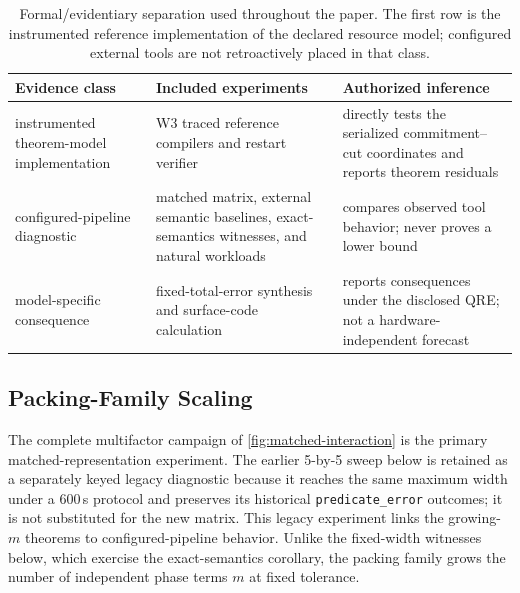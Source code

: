 \documentclass[a4paper,twocolumn,10pt,unpublished]{quantumarticle}
\begin{document}
\begin{table}[!t]
\centering
\small
\setlength{\tabcolsep}{4pt}
\begin{tabularx}{\textwidth}{@{}l X X@{}}
\toprule
Evidence class & Included experiments & Authorized inference \\
\midrule
instrumented theorem-model implementation & W3 traced reference compilers and restart verifier & directly tests the serialized commitment--cut coordinates and reports theorem residuals \\
configured-pipeline diagnostic & matched matrix, external semantic baselines, exact-semantics witnesses, and natural workloads & compares observed tool behavior; never proves a lower bound \\
model-specific consequence & fixed-total-error synthesis and surface-code calculation & reports consequences under the disclosed QRE; not a hardware-independent forecast \\
\bottomrule
\end{tabularx}
\caption{Formal/evidentiary separation used throughout the paper.  The first
row is the instrumented reference implementation of the declared resource
model; configured external tools are not retroactively placed in that class.}
\label{tab:evidence-classes}
\end{table}

\subsection{Packing-Family Scaling}
\label{sec:packing-scaling}

The complete multifactor campaign of \cref{fig:matched-interaction}
is the primary matched-representation experiment.  The earlier 5-by-5 sweep
below is retained as a separately keyed legacy diagnostic because it reaches
the same maximum width under a 600\,s protocol and preserves its historical
\texttt{predicate\_error} outcomes; it is not substituted for the new matrix.
This legacy experiment links the growing-$m$ theorems to configured-pipeline
behavior. Unlike the fixed-width witnesses below, which exercise the
exact-semantics corollary, the packing family grows the number of
independent phase terms $m$ at fixed tolerance.
\end{document}
